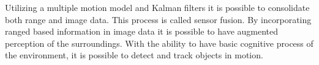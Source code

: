 Utilizing a multiple motion model and Kalman filters it is possible to consolidate both range and image data. This process is called sensor fusion. By incorporating ranged based information in image data it is possible to have augmented perception of the surroundings. With the ability to have basic cognitive process of the environment, it is possible to detect and track objects in motion.

 



